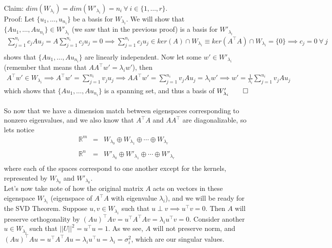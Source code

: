 \documentclass[11pt]{article}
\begin{document}
Claim: $dim(W_{\lambda_i}) = dim(W'_{\lambda_i}) = n_i \ \forall \ i \in \{1,\dots,r\}$.\\
Proof: Let $\{u_1,\dots,u_{n_i}\}$ be a basis for $W_{\lambda_i}$. We will show that $\{Au_1,\dots,Au_{n_i}\} \in W'_{\lambda_i}$ (we saw that in the previous proof) is a basis for $W'_{\lambda_i}$
\begin{eqnarray*}
\sum_{j=1}^{n_i} c_j Au_j = A\sum_{j=1}^{n_i} c_j u_j = 0 \implies \sum_{j=1}^{n_i} c_j u_j \in ker(A) \cap W_{\lambda_i} \equiv ker(A^\intercal A) \cap W_{\lambda_i} = \{0\} \implies c_j = 0 \ \forall \ j\\
\end{eqnarray*}
shows that $\{Au_1,\dots,Au_{n_i}\}$ are linearly independent. Now let some $w' \in W'_{\lambda_i}$ (remember that means that $AA^\intercal w' = \lambda_i w'$), then
\begin{eqnarray*}
A^\intercal w' \in W_{\lambda_i} \implies A^\intercal w' = \sum_{j=1}^{n_i} v_ju_j \implies AA^\intercal w' = \sum_{j=1}^{n_i} v_j Au_j = \lambda_i w' \implies w' = \frac{1}{\lambda_i}\sum_{j=1}^{n_i}v_j Au_j
\end{eqnarray*}
which shows that $\{Au_1,\dots,Au_{n_i}\}$ is a spanning set, and thus a basis of $W'_{\lambda_i} \qed$\\\\

So now that we have a dimension match between eigenspaces corresponding to nonzero eigenvalues, and we also know that $A^\intercal A$ and $AA^\intercal$ are diagonalizable, so lets notice
\begin{eqnarray*}
\mathbb{R}^m &=& W_{\lambda_0} \oplus W_{\lambda_1} \oplus \cdots \oplus W_{\lambda_r}\\
&&\\
\mathbb{R}^n &=& W'_{\lambda_0} \oplus W'_{\lambda_1} \oplus \cdots \oplus W'_{\lambda_r}\\
\end{eqnarray*}
where each of the spaces correspond to one another except for the kernels, represented by $W_{\lambda_0}$ and $W'_{\lambda_0}$.\\

Let's now take note of how the original matrix $A$ acts on vectors in these eigenspace $W_{\lambda_i}$ (eigenspace of $A^\intercal A$ with eigenvalue $\lambda_i$), and we will be ready for the SVD Theorem. Suppose $u,v \in W_{\lambda_i}$ such that $u \perp v \implies u^\intercal v = 0$. Then $A$ will preserve orthogonality by $(Au)^\intercal Av = u^\intercal A^\intercal A v = \lambda_i u^\intercal v = 0$. Consider another $u \in W_{\lambda_i}$ such that $\vert\vert U \vert\vert^2 = u^\intercal u = 1$. As we see, $A$ will not preserve norm, and $(Au)^\intercal Au = u^\intercal A^\intercal A u = \lambda_i u^\intercal u = \lambda_i = \sigma_i^2$, which are our singular values.
\end{document}
